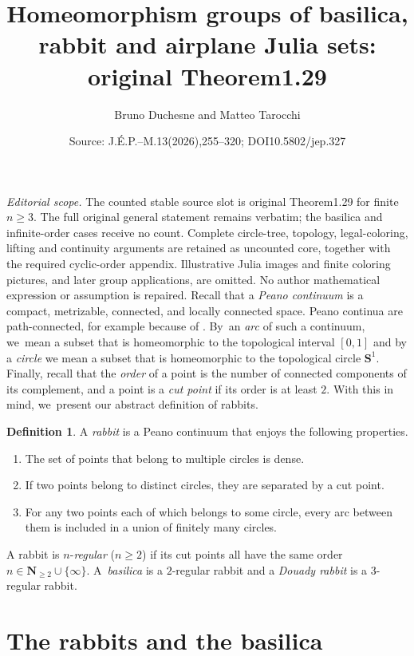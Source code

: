 \documentclass[10pt,a4paper]{amsart}
\title[Regular-rabbit universal homeomorphism group]{Homeomorphism groups of basilica, rabbit and airplane Julia sets: original Theorem1.29}
\author{Bruno Duchesne and Matteo Tarocchi}
\date{Source: J.\'E.P.--M.13(2026),255--320; DOI10.5802/jep.327}
\theoremstyle{definition}
\newtheorem{introdefinition}{Definition}
\begin{document}
\maketitle
\noindent\textit{Editorial scope.} The counted stable source slot is original Theorem1.29 for finite $n\ge3$. The full original general statement remains verbatim; the basilica and infinite-order cases receive no count. Complete circle-tree, topology, legal-coloring, lifting and continuity arguments are retained as uncounted core, together with the required cyclic-order appendix. Illustrative Julia images and finite coloring pictures, and later group applications, are omitted. No author mathematical expression or assumption is repaired.
Recall that a \emph{Peano continuum} is a compact, metrizable, connected, and locally connected space.
Peano continua are path-connected, for example because of \cite[Th.\,8.23]{continua}. By~an \emph{arc} of such a continuum, we~mean a subset that is homeomorphic to the topological interval $[0,1]$ and by a \emph{circle} we mean a subset that is homeomorphic to the topological circle $\mathbf{S}^1$.
Finally, recall that the \emph{order} of a point is the number of connected components of its complement, and a point is a \emph{cut point} if its order is at least $2$.
With this in mind, we~present our abstract definition of rabbits.

\begin{introdefinition}
\label{def.rabbit}
A \emph{rabbit} is a Peano continuum that enjoys the following properties.
\begin{enumerate}
\item\label{def.rabbit1} The set of points that belong to multiple circles is dense.
\item\label{def.rabbit2} If two points belong to distinct circles, they are separated by a cut point.
\item\label{def.rabbit3} For any two points each of which belongs to some circle, every arc between them is included in a union of finitely many circles.
\end{enumerate}
A rabbit is $n$-\emph{regular} ($n\geq2$) if its cut points all have the same order $n \in \mathbf{N}_{\geq 2} \cup \{\infty\}$. A~\emph{basilica} is a $2$-regular rabbit and a \emph{Douady rabbit} is a $3$-regular rabbit.
\end{introdefinition}

\section{The rabbits and the basilica}
\label{sec.rabbits}
\end{document}
